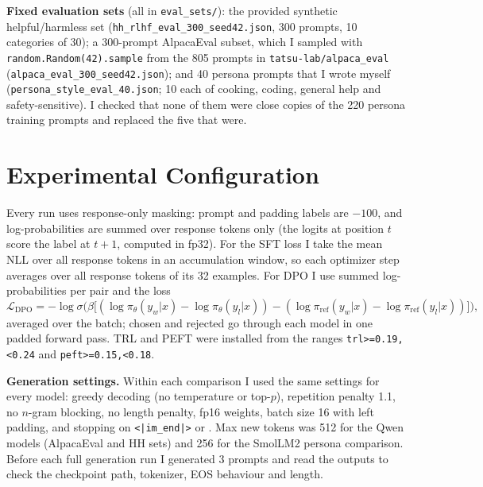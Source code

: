 \documentclass[10pt,a4paper]{article}
\newcommand{\code}[1]{\texttt{\small #1}}
\begin{document}
\begin{table}[h]
\centering

\caption{Training data. Counts are after filtering; the id of every example is listed in \code{results/data/data\_manifest.json}.}
\end{table}

\textbf{Fixed evaluation sets} (all in \code{eval\_sets/}): the provided synthetic helpful/harmless set (\code{hh\_rlhf\_eval\_300\_seed42.json},
300 prompts, 10 categories of 30); a 300-prompt AlpacaEval subset, which I sampled with \code{random.Random(42).sample} from the 805 prompts in
\code{tatsu-lab/alpaca\_eval} (\code{alpaca\_eval\_300\_seed42.json}); and 40 persona prompts that I wrote myself
(\code{persona\_style\_eval\_40.json}; 10 each of cooking, coding, general help and safety-sensitive). I checked that none of them were close copies
of the 220 persona training prompts and replaced the five that were.

\section{Experimental Configuration}

\begin{table}[h]
\centering

\caption{Configuration actually used for the submitted checkpoints. Software: \softwareinfo.}
\end{table}

Every run uses response-only masking: prompt and padding labels are $-100$, and log-probabilities are summed over response tokens only (the
logits at position $t$ score the label at $t{+}1$, computed in fp32). For the SFT loss I take the mean NLL over all response tokens in an
accumulation window, so each optimizer step averages over all response tokens of its 32 examples. For DPO I use summed log-probabilities per pair
and the loss
\[
\mathcal{L}_{\text{DPO}} = -\log\sigma\!\Big(\beta\big[(\log\pi_\theta(y_w|x)-\log\pi_\theta(y_l|x))-(\log\pi_{\text{ref}}(y_w|x)-\log\pi_{\text{ref}}(y_l|x))\big]\Big),
\]
averaged over the batch; chosen and rejected go through each model in one padded forward pass. TRL and PEFT were installed from the ranges
\code{trl>=0.19,<0.24} and \code{peft>=0.15,<0.18}.

\textbf{Generation settings.} Within each comparison I used the same settings for every model: greedy decoding (no temperature or top-$p$),
repetition penalty 1.1, no $n$-gram blocking, no length penalty, fp16 weights, batch size 16 with left padding, and stopping on
\code{<|im\_end|>} or \code{<|endoftext|>}. Max new tokens was 512 for the Qwen models (AlpacaEval and HH sets) and 256 for the SmolLM2 persona
comparison. Before each full generation run I generated 3 prompts and read the outputs to check the checkpoint path, tokenizer, EOS behaviour
and length.
\end{document}
